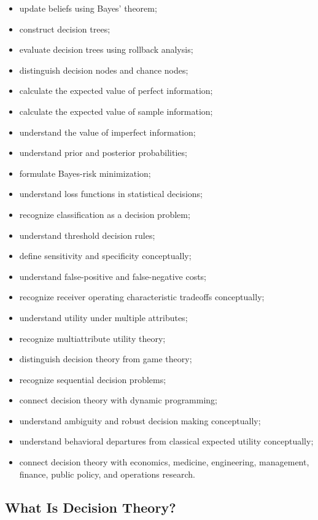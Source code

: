 {\begin{itemize}
    \item update beliefs using Bayes' theorem;
    \item construct decision trees;
    \item evaluate decision trees using rollback analysis;
    \item distinguish decision nodes and chance nodes;
    \item calculate the expected value of perfect information;
    \item calculate the expected value of sample information;
    \item understand the value of imperfect information;
    \item understand prior and posterior probabilities;
    \item formulate Bayes-risk minimization;
    \item understand loss functions in statistical decisions;
    \item recognize classification as a decision problem;
    \item understand threshold decision rules;
    \item define sensitivity and specificity conceptually;
    \item understand false-positive and false-negative costs;
    \item recognize receiver operating characteristic tradeoffs
          conceptually;
    \item understand utility under multiple attributes;
    \item recognize multiattribute utility theory;
    \item distinguish decision theory from game theory;
    \item recognize sequential decision problems;
    \item connect decision theory with dynamic programming;
    \item understand ambiguity and robust decision making conceptually;
    \item understand behavioral departures from classical expected
          utility conceptually;
    \item connect decision theory with economics, medicine, engineering,
          management, finance, public policy, and operations research.
\end{itemize}
}

\subsection{What Is Decision Theory?}
\label{subsec:what-is-decision-theory}

